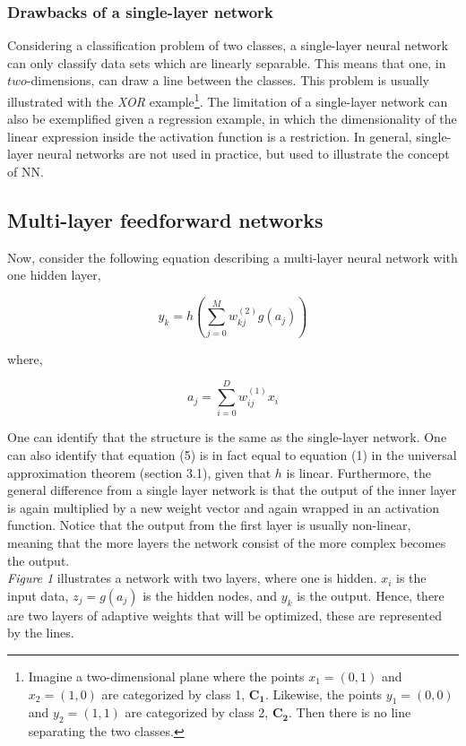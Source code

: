 \documentclass[12pt, letterpaper]{amsart}%
\begin{document}
\subsubsection{Drawbacks of a single-layer network}
Considering a classification problem of two classes, a single-layer neural network can only classify data sets which are linearly separable. This means that one, in $two$-dimensions, can draw a line between the classes. This problem is usually illustrated with the \textit{XOR} example\footnote{Imagine a two-dimensional plane where the points $x_1 = (0,1)$ and $x_2 = (1,0)$ are categorized by class 1, $\mathbf{C_1}$. Likewise, the points $y_1=(0,0)$ and $y_2=(1,1)$ are categorized by class 2, $\mathbf{C_2}$. Then there is no line separating the two classes.}. The limitation of a single-layer network can also be exemplified given a regression example, in which the dimensionality of the linear expression inside the activation function is a restriction. In general, single-layer neural networks are not used in practice, but used to illustrate the concept of NN. 


\subsection{Multi-layer feedforward networks}
Now, consider the following equation describing a multi-layer neural network with one hidden layer,

\begin{equation}
y_k = h \left( \sum_{j=0}^M w_{kj}^{(2)} g \left( a_j \right) \right)
\end{equation}

where,

\begin{equation}
a_j = \sum_{i=0}^D w_{ij}^{(1)} x_i
\end{equation}

One can identify that the structure is the same as the single-layer network. One can also identify that equation (5) is in fact equal to equation (1) in the universal approximation theorem (section 3.1), given that $h$ is linear. Furthermore, the general difference from a single layer network is that the output of the inner layer is again multiplied by a new weight vector and again wrapped in an activation function. Notice that the output from the first layer is usually non-linear, meaning that the more layers the network consist of the more complex becomes the output.
\\

\textit{Figure 1} illustrates a network with two layers, where one is hidden. $x_i$ is the input data, $z_j = g(a_j)$ is the hidden nodes, and $y_k$ is the output. Hence, there are two layers of adaptive weights that will be optimized, these are represented by the lines.
\end{document}
